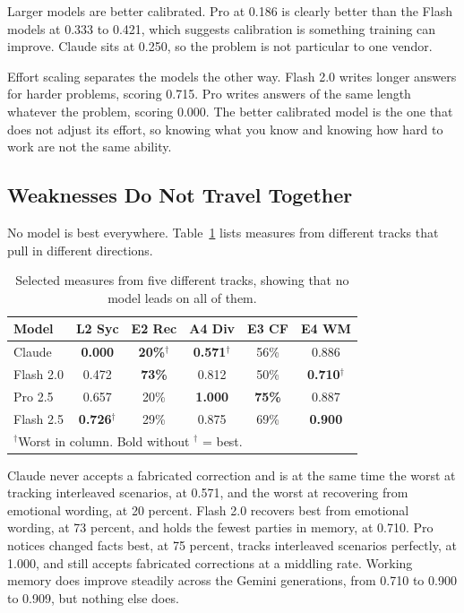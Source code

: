 \documentclass[conference]{IEEEtran}
\begin{document}
Larger models are better calibrated. Pro at 0.186 is clearly better than the Flash models at 0.333 to 0.421, which suggests calibration is something training can improve. Claude sits at 0.250, so the problem is not particular to one vendor.

Effort scaling separates the models the other way. Flash 2.0 writes longer answers for harder problems, scoring 0.715. Pro writes answers of the same length whatever the problem, scoring 0.000. The better calibrated model is the one that does not adjust its effort, so knowing what you know and knowing how hard to work are not the same ability.

\subsection{Weaknesses Do Not Travel Together}

No model is best everywhere. Table~\ref{tab:profiles} lists measures from different tracks that pull in different directions.

\begin{table}[htbp]
\caption{Selected measures from five different tracks, showing that no model leads on all of them.}
\label{tab:profiles}
\centering
\footnotesize
\begin{tabular}{@{}lccccc@{}}
\toprule
\textbf{Model} & \textbf{L2 Syc} & \textbf{E2 Rec} & \textbf{A4 Div} & \textbf{E3 CF} & \textbf{E4 WM} \\
\midrule
Claude & \textbf{0.000} & \textbf{20\%}$^\dagger$ & \textbf{0.571}$^\dagger$ & 56\% & 0.886 \\
Flash 2.0 & 0.472 & \textbf{73\%} & 0.812 & 50\% & \textbf{0.710}$^\dagger$ \\
Pro 2.5 & 0.657 & 20\% & \textbf{1.000} & \textbf{75\%} & 0.887 \\
Flash 2.5 & \textbf{0.726}$^\dagger$ & 29\% & 0.875 & 69\% & \textbf{0.900} \\
\bottomrule
\multicolumn{6}{l}{\footnotesize $^\dagger$Worst in column. Bold without $^\dagger$ = best.}
\end{tabular}
\end{table}

Claude never accepts a fabricated correction and is at the same time the worst at tracking interleaved scenarios, at 0.571, and the worst at recovering from emotional wording, at 20 percent. Flash 2.0 recovers best from emotional wording, at 73 percent, and holds the fewest parties in memory, at 0.710. Pro notices changed facts best, at 75 percent, tracks interleaved scenarios perfectly, at 1.000, and still accepts fabricated corrections at a middling rate. Working memory does improve steadily across the Gemini generations, from 0.710 to 0.900 to 0.909, but nothing else does.
\end{document}
